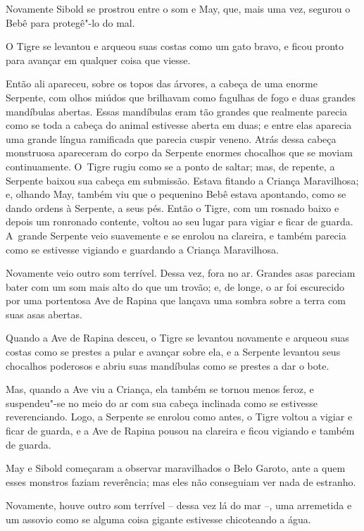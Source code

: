 Novamente Sibold se prostrou entre o som e May, que, mais uma vez,
segurou o Bebê para protegê"-lo do mal.

O Tigre se levantou e arqueou suas costas como um gato bravo, e ficou
pronto para avançar em qualquer coisa que viesse.

Então ali apareceu, sobre os topos das árvores, a cabeça de uma enorme
Serpente, com olhos miúdos que brilhavam como fagulhas de fogo e duas
grandes mandíbulas abertas. Essas mandíbulas eram tão grandes que
realmente parecia como se toda a cabeça do animal estivesse aberta em
duas; e entre elas aparecia uma grande língua ramificada que parecia
cuspir veneno. Atrás dessa cabeça monstruosa apareceram do corpo da
Serpente enormes chocalhos que se moviam continuamente. O~Tigre rugiu
como se a ponto de saltar; mas, de repente, a Serpente baixou sua cabeça
em submissão. Estava fitando a Criança Maravilhosa; e, olhando May,
também viu que o pequenino Bebê estava apontando, como se dando ordens à
Serpente, a seus pés. Então o Tigre, com um rosnado baixo e depois um
ronronado contente, voltou ao seu lugar para vigiar e ficar de guarda. A~grande Serpente veio suavemente e se enrolou na clareira, e também
parecia como se estivesse vigiando e guardando a Criança Maravilhosa.

Novamente veio outro som terrível. Dessa vez, fora no ar. Grandes asas
pareciam bater com um som mais alto do que um trovão; e, de longe, o ar
foi escurecido por uma portentosa Ave de Rapina que lançava uma sombra
sobre a terra com suas asas abertas.

Quando a Ave de Rapina desceu, o Tigre se levantou novamente e arqueou
suas costas como se prestes a pular e avançar sobre ela, e a Serpente
levantou seus chocalhos poderosos e abriu suas mandíbulas como se
prestes a dar o bote.

Mas, quando a Ave viu a Criança, ela também se tornou menos feroz, e
suspendeu"-se no meio do ar com sua cabeça inclinada como se estivesse
reverenciando. Logo, a Serpente se enrolou como antes, o Tigre voltou a
vigiar e ficar de guarda, e a Ave de Rapina pousou na clareira e ficou
vigiando e também de guarda.

May e Sibold começaram a observar maravilhados o Belo Garoto, ante a
quem esses monstros faziam reverência; mas eles não conseguiam ver nada
de estranho.

Novamente, houve outro som terrível -- dessa vez lá do mar --, uma
arremetida e um assovio como se alguma coisa gigante estivesse
chicoteando a água.

